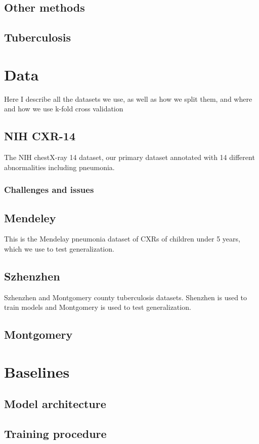 \documentclass[12pt,twoside,a4paper]{report}
\begin{document}
\section{Other methods}
\section{Tuberculosis}
\chapter{Data}
Here I describe all the datasets we use, as well as how we split them, and where
and how we use k-fold cross validation
\section{NIH CXR-14\label{nih_cxr}}
The NIH chestX-ray 14 dataset, our primary dataset annotated with 14 different
abnormalities including pneumonia.
\subsection{Challenges and issues}
\section{Mendeley\label{mendeley}}
This is the Mendelay pneumonia dataset of CXRs of children under 5 years, which
we use to test generalization.
\section{Szhenzhen\label{szhenzhen}}
Szhenzhen and Montgomery county tuberculosis datasets. Shenzhen is used to train
models and Montgomery is used to test generalization.
\section{Montgomery\label{montgomery}}
\chapter{Baselines}
\section{Model architecture\label{architecture}}
\section{Training procedure\label{training_procedure}}
\end{document}
